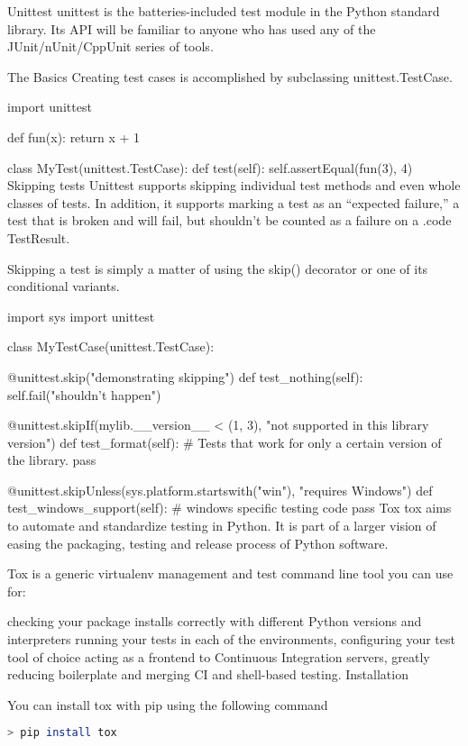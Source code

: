 Unittest
unittest is the batteries-included test module in the Python standard library. Its API will be familiar to anyone who has used any of the JUnit/nUnit/CppUnit series of tools.

The Basics
Creating test cases is accomplished by subclassing unittest.TestCase.

import unittest

def fun(x):
    return x + 1

class MyTest(unittest.TestCase):
    def test(self):
        self.assertEqual(fun(3), 4)
Skipping tests
Unittest supports skipping individual test methods and even whole classes of tests. In addition, it supports marking a test as an “expected failure,” a test that is broken and will fail, but shouldn’t be counted as a failure on a .code TestResult.

Skipping a test is simply a matter of using the skip() decorator or one of its conditional variants.

import sys
import unittest

class MyTestCase(unittest.TestCase):

    @unittest.skip("demonstrating skipping")
    def test_nothing(self):
        self.fail("shouldn't happen")

    @unittest.skipIf(mylib.__version__ < (1, 3),
                     "not supported in this library version")
    def test_format(self):
        # Tests that work for only a certain version of the library.
        pass

    @unittest.skipUnless(sys.platform.startswith("win"), "requires Windows")
    def test_windows_support(self):
        # windows specific testing code
        pass
Tox
tox aims to automate and standardize testing in Python. It is part of a larger vision of easing the packaging, testing and release process of Python software.

Tox is a generic virtualenv management and test command line tool you can use for:

checking your package installs correctly with different Python versions and interpreters
running your tests in each of the environments, configuring your test tool of choice
acting as a frontend to Continuous Integration servers, greatly reducing boilerplate and merging CI and shell-based testing.
Installation

You can install tox with pip using the following command

\begin{lstlisting}[language=bash]
> pip install tox
\end{lstlisting}

